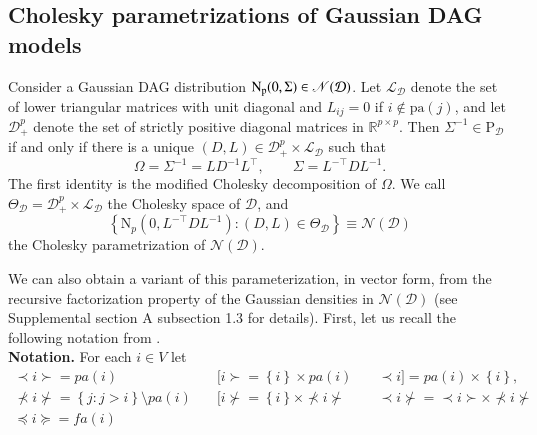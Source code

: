 \documentclass[12pt]{article}
\newcommand{\R}{\mathbb{R}}
\newcommand{\D}{\mathcal{D}}
\newcommand{\Pd}{\mathrm{P}_{\D}}
\theoremstyle{plain}
\theoremstyle{definition}
\theoremstyle{remark}
\begin{document}
\subsection{Cholesky parametrizations of Gaussian DAG models}\label{subs:d_parameterization}
%
Consider a Gaussian DAG distribution $\rm{N}_{p}(0,\Sigma )\in
\mathscr{N}(\D)$.  Let $\mathcal{L}_{\D}$ denote the set of lower
triangular matrices with unit diagonal and \(L_{ij}=0\) if
\(i\notin\mathrm{pa}(j)\), and let $\mathcal{D}_{+}^{p}$ denote the set
of strictly positive diagonal matrices in $\R^{p\times p}$.  Then
\(\Sigma^{-1}\in\Pd\) if and only if there is a unique
\((D,L)\in\mathcal{D}_{+}^{p}\times\mathcal{L}_{\D}\) such that
\[
\Omega=\Sigma^{-1}=LD^{-1}L^{\top},
\qquad
\Sigma=L^{-\top}DL^{-1}.
\]
The first identity is the modified Cholesky decomposition of
\(\Omega\).  We call
\(\Theta_{\D}=\mathcal{D}_{+}^{p}\times\mathcal{L}_{\D}\) the Cholesky
space of \(\D\), and
\[
\left\{\mathrm{N}_p(0,L^{-\top}DL^{-1}): (D,L)\in\Theta_{\D}\right\}
\equiv\mathscr{N}(\D)
\]
the Cholesky parametrization of \(\mathscr{N}(\D)\).

\noindent We can also obtain a variant of this parameterization, in vector form, from the recursive factorization property of the Gaussian densities in  $\mathscr{N}(\D)$ (see Supplemental section A subsection 1.3 for details). First, let us recall the following notation from \cite{andersson98}.\\
\noindent
  \textbf{Notation.} For each $i\in V$ let
  \[
  \begin{array}{lcl}
  \prec i\succ=pa(i)&\quad[i\succ=\left\{i\right\}\times pa(i)&\quad  \prec i ]=pa(i)\times\left\{i\right\},\\
  \nprec i \nsucc=\left\{j: j>i\right\}\setminus pa(i)& \quad[ i\nsucc =\left\{i\right\}\times \nprec i \nsucc &\quad \prec i\nsucc=\prec i\succ \times \nprec i\nsucc\\
   \preceq i\succeq=fa(i) &  &
  \end{array}
  \]
  
\end{document}
